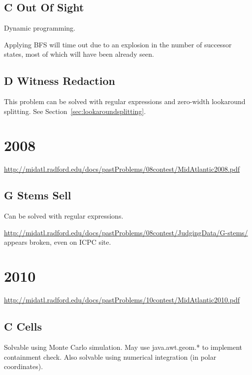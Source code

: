 \subsection{C Out Of Sight}
\label{sec:2007-c-sight}

Dynamic programming.  

Applying BFS will time out due to an explosion in the number
of successor states, most of which will have been already seen.

\subsection{D Witness Redaction}
\label{sec:2007-d-witness}
This problem can be solved with regular expressions and zero-width lookaround splitting.
See Section~\ref{sec:lookaroundsplitting}.

\section{2008}
\href{(Problem PDF 2008)}{http://midatl.radford.edu/docs/pastProblems/08contest/MidAtlantic2008.pdf}

\subsection{G Stems Sell}
\label{sec:2008-g-stems}

Can be solved with regular expressions.

\href{Judge data}{http://midatl.radford.edu/docs/pastProblems/08contest/JudgingData/G-stems/}
appears broken, even on ICPC site.


\section{2010}
\href{(Problem PDF 2010)}{http://midatl.radford.edu/docs/pastProblems/10contest/MidAtlantic2010.pdf}

\subsection{C Cells}
\label{sec:2010-c-cells}

Solvable using Monte Carlo simulation.  May use java.awt.geom.* to implement containment check.
Also solvable using numerical integration (in polar coordinates).

